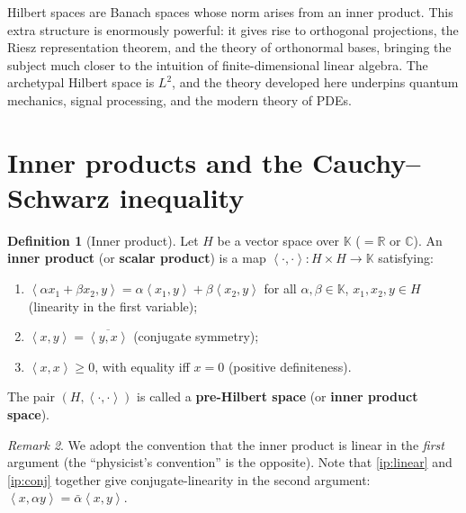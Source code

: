 \documentclass[a4paper,12pt]{book}
\newcommand{\R}{\mathbb{R}}
\newcommand{\C}{\mathbb{C}}
\newcommand{\K}{\mathbb{K}}
\newcommand{\inner}[2]{\left\langle #1, #2 \right\rangle}
\theoremstyle{definition}
\newtheorem{definition}{Definition}[chapter]
\theoremstyle{plain}
\theoremstyle{remark}
\newtheorem{remark}[definition]{Remark}
\begin{document}
\noindent
Hilbert spaces are Banach spaces whose norm arises from
an inner product.  This extra structure is enormously powerful: it gives rise
to orthogonal projections, the Riesz
representation theorem, and the theory of
orthonormal bases, bringing the subject much closer
to the intuition of finite-dimensional linear algebra.  The archetypal
Hilbert space is $L^2$, and the theory developed here
underpins quantum mechanics, signal
processing, and the modern theory of PDEs.

\section{Inner products and the Cauchy--Schwarz inequality}
\label{sec:inner-products}

\begin{definition}[Inner product]
\label{def:inner-product}
Let $H$ be a vector space over $\K$ ($=\R$ or $\C$).  An \textbf{inner
product} (or \textbf{scalar product}) is a map
$\inner{\cdot}{\cdot}:H\times H\to\K$ satisfying:
\begin{enumerate}[label=\textup{(IP\arabic*)}]
  \item \label{ip:linear}
    $\inner{\alpha x_1+\beta x_2}{y}
    =\alpha\inner{x_1}{y}+\beta\inner{x_2}{y}$
    for all $\alpha,\beta\in\K$, $x_1,x_2,y\in H$
    \hfill(linearity in the first variable);
  \item \label{ip:conj}
    $\inner{x}{y}=\overline{\inner{y}{x}}$
    \hfill(conjugate symmetry);
  \item \label{ip:pos}
    $\inner{x}{x}\ge 0$, with equality iff $x=0$
    \hfill(positive definiteness).
\end{enumerate}
The pair $(H,\inner{\cdot}{\cdot})$ is called a
\textbf{pre-Hilbert space}
(or \textbf{inner product space}).
\end{definition}

\begin{remark}
\label{rem:convention}
We adopt the convention that the inner product is linear in the
\emph{first} argument (the ``physicist's convention''
is the opposite).  Note that \ref{ip:linear} and \ref{ip:conj} together
give conjugate-linearity in the second argument:
$\inner{x}{\alpha y}=\bar\alpha\inner{x}{y}$.
\end{remark}
\end{document}
